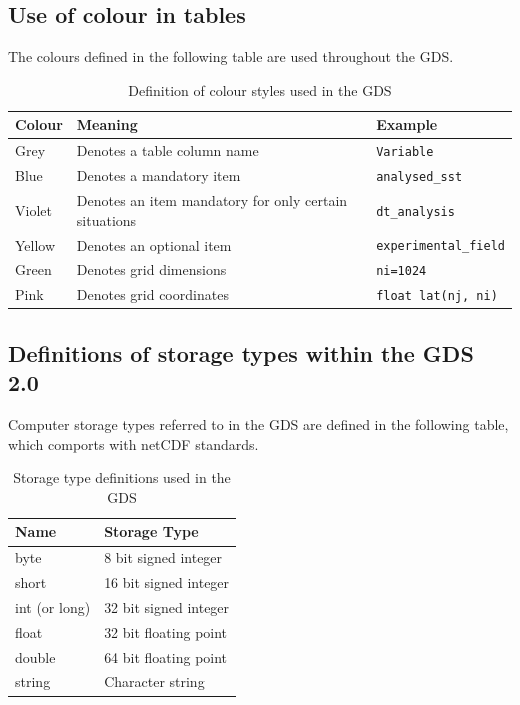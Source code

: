 \subsection{Use of colour in tables}
The colours defined in the following table are used throughout the GDS.
\begin{table}[h]
    \centering
    \caption{Definition of colour styles used in the GDS}
    \label{tab:color-styles}
    \begin{tabular}{|l|l|l|}
        \hline
        \rowcolor{lightgray} \textbf{Colour} & \textbf{Meaning} & \textbf{Example}\\
        \hline
        Grey & Denotes a table column name & \cellcolor{lightgray} \texttt{Variable}\\
        \hline
        Blue & Denotes a mandatory item & \cellcolor{cyan} \texttt{analysed\_sst}\\
        \hline
        Violet & Denotes an item mandatory for only certain situations & \cellcolor{Thistle} \texttt{dt\_analysis}\\
        \hline
        Yellow & Denotes an optional item & \cellcolor{Goldenrod} \texttt{experimental\_field}\\
        \hline
        Green & Denotes grid dimensions & \cellcolor{YellowGreen} \texttt{ni=1024}\\
        \hline
        Pink & Denotes grid coordinates & \cellcolor{Apricot} \texttt{float lat(nj, ni)}\\
        \hline
    \end{tabular}
\end{table}

\subsection{Definitions of storage types within the GDS 2.0}
Computer storage types referred to in the GDS are defined in the following table, which comports with netCDF standards.

\begin{table}[h]
    \centering
    \caption{Storage type definitions used in the GDS}
    \label{tab:storage-definitions}
    \begin{tabular}{|l|l|}
        \hline
        \rowcolor{lightgray} \textbf{Name} & \textbf{Storage Type}\\
        \hline
        byte & 8 bit signed integer\\
        \hline
        short & 16 bit signed integer\\
        \hline
        int (or long) & 32 bit signed integer\\
        \hline
        float & 32 bit floating point\\
        \hline
        double & 64 bit floating point\\
        \hline
        string & Character string\\
        \hline
    \end{tabular}
\end{table}
